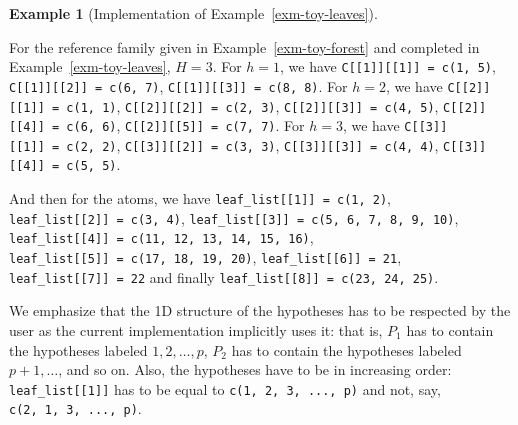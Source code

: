 \documentclass[
  11pt,
  a4paper,
]{article}
\theoremstyle{plain}
\theoremstyle{plain}
\theoremstyle{definition}
\newtheorem{example}{Example}[section]
\theoremstyle{plain}
\theoremstyle{definition}
\theoremstyle{remark}
\newcounter{quartocalloutcauno}
\newcommand{\quartocalloutcau}[1]{\refstepcounter{quartocalloutcauno}\label{#1}}
\begin{document}
\begin{example}[Implementation of
Example~\ref{exm-toy-leaves}]\protect\hypertarget{exm-implementation}{}\label{exm-implementation}

For the reference family given in Example~\ref{exm-toy-forest} and
completed in Example~\ref{exm-toy-leaves}, \(H=3\). For \(h=1\), we have
\texttt{C{[}{[}1{]}{]}{[}{[}1{]}{]}\ =\ c(1,\ 5)},
\texttt{C{[}{[}1{]}{]}{[}{[}2{]}{]}\ =\ c(6,\ 7)},
\texttt{C{[}{[}1{]}{]}{[}{[}3{]}{]}\ =\ c(8,\ 8)}. For \(h=2\), we have
\texttt{C{[}{[}2{]}{]}{[}{[}1{]}{]}\ =\ c(1,\ 1)},
\texttt{C{[}{[}2{]}{]}{[}{[}2{]}{]}\ =\ c(2,\ 3)},
\texttt{C{[}{[}2{]}{]}{[}{[}3{]}{]}\ =\ c(4,\ 5)},
\texttt{C{[}{[}2{]}{]}{[}{[}4{]}{]}\ =\ c(6,\ 6)},
\texttt{C{[}{[}2{]}{]}{[}{[}5{]}{]}\ =\ c(7,\ 7)}. For \(h=3\), we have
\texttt{C{[}{[}3{]}{]}{[}{[}1{]}{]}\ =\ c(2,\ 2)},
\texttt{C{[}{[}3{]}{]}{[}{[}2{]}{]}\ =\ c(3,\ 3)},
\texttt{C{[}{[}3{]}{]}{[}{[}3{]}{]}\ =\ c(4,\ 4)},
\texttt{C{[}{[}3{]}{]}{[}{[}4{]}{]}\ =\ c(5,\ 5)}.

And then for the atoms, we have
\texttt{leaf\_list{[}{[}1{]}{]}\ =\ c(1,\ 2)},
\texttt{leaf\_list{[}{[}2{]}{]}\ =\ c(3,\ 4)},
\texttt{leaf\_list{[}{[}3{]}{]}\ =\ c(5,\ 6,\ 7,\ 8,\ 9,\ 10)},
\texttt{leaf\_list{[}{[}4{]}{]}\ =\ c(11,\ 12,\ 13,\ 14,\ 15,\ 16)},
\texttt{leaf\_list{[}{[}5{]}{]}\ =\ c(17,\ 18,\ 19,\ 20)},
\texttt{leaf\_list{[}{[}6{]}{]}\ =\ 21},
\texttt{leaf\_list{[}{[}7{]}{]}\ =\ 22} and finally
\texttt{leaf\_list{[}{[}8{]}{]}\ =\ c(23,\ 24,\ 25)}.

\end{example}

\begin{tcolorbox}[enhanced jigsaw, left=2mm, coltitle=black, toptitle=1mm, colback=white, bottomtitle=1mm, breakable, title=\textcolor{quarto-callout-caution-color}{\faFire}\hspace{0.5em}{Caution \ref*{cau-impl}: Caution}, titlerule=0mm, arc=.35mm, opacityback=0, opacitybacktitle=0.6, colbacktitle=quarto-callout-caution-color!10!white, toprule=.15mm, bottomrule=.15mm, rightrule=.15mm, colframe=quarto-callout-caution-color-frame, leftrule=.75mm]

\quartocalloutcau{cau-impl} 

We emphasize that the 1D structure of the hypotheses has to be respected
by the user as the current implementation implicitly uses it: that is,
\(P_1\) has to contain the hypotheses labeled \(1, 2, \dotsc, p\),
\(P_2\) has to contain the hypotheses labeled \(p+1, \dotsc\), and so
on. Also, the hypotheses have to be in increasing order:
\texttt{leaf\_list{[}{[}1{]}{]}} has to be equal to
\texttt{c(1,\ 2,\ 3,\ ...,\ p)} and not, say,
\texttt{c(2,\ 1,\ 3,\ ...,\ p)}.

\end{tcolorbox}
\end{document}
